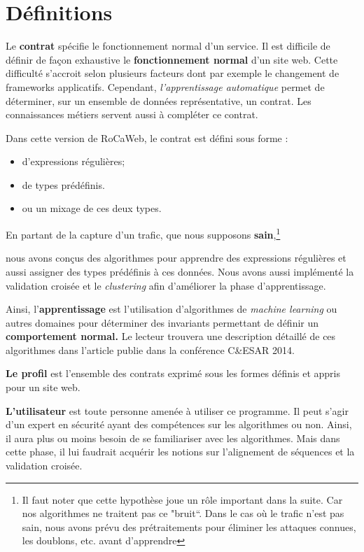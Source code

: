 \documentclass[a4paper,10pt,justified]{book}
\begin{document}
\section{Définitions}

Le \textbf{contrat} spécifie le fonctionnement normal d'un service. Il est difficile de définir de façon exhaustive le \textbf{fonctionnement normal} d'un site web. 
Cette difficulté s'accroit selon plusieurs facteurs dont par exemple le changement de frameworks applicatifs. 
Cependant, \textit{l'apprentissage automatique} permet de déterminer, sur un ensemble de données représentative, un contrat. Les connaissances métiers servent aussi à compléter ce contrat. 

Dans cette version de RoCaWeb, le contrat est défini sous forme :
\begin{itemize}
 \item d'expressions régulières;
 \item de types prédéfinis.
 \item ou un mixage de ces deux types. 
\end{itemize}

En partant de la capture d'un trafic, que nous supposons \textbf{sain},\footnote{Il faut noter que cette hypothèse joue un rôle important dans la suite. Car nos algorithmes ne traitent pas ce "bruit``.
Dans le cas où le trafic n'est pas sain, nous avons prévu des prétraitements pour éliminer les attaques connues, les doublons, etc. avant d'apprendre} 

nous avons conçus des algorithmes pour apprendre des expressions régulières et aussi assigner des types prédéfinis
à ces données. Nous avons aussi implémenté la validation croisée et le \textit{clustering} afin d'améliorer la phase d'apprentissage.

Ainsi, l'\textbf{apprentissage} est l'utilisation d'algorithmes de \textit{machine learning} 
ou autres domaines pour déterminer des invariants permettant de définir un \textbf{comportement normal.}
Le lecteur trouvera une description détaillé de ces algorithmes dans l'article publie dans la conférence C\&ESAR 2014. 

\textbf{Le profil} est l'ensemble des contrats exprimé sous les formes définis et appris pour un site web.  

\textbf{L'utilisateur} est toute personne amenée à utiliser ce programme. Il peut s'agir d'un expert en sécurité ayant des compétences sur les algorithmes ou non. 
Ainsi, il aura plus ou moins besoin de se familiariser avec les algorithmes. Mais dans cette phase, il lui faudrait acquérir les notions sur l'alignement de séquences et la validation croisée.  
\end{document}
